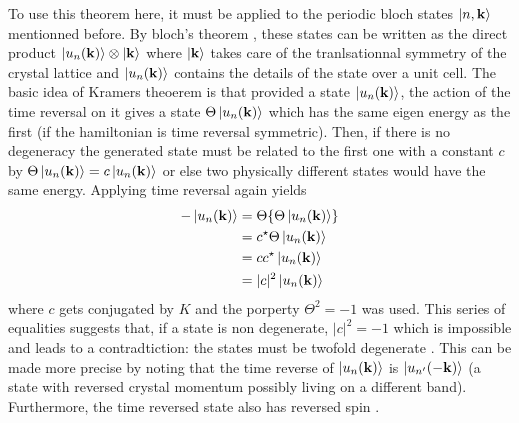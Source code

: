 To use this theorem here, it must be applied to the periodic bloch states $\ket{n, \mathbf{k}}$ mentionned before. By bloch's theorem \cite{girvin_modern_2019}, these states can be written as the direct product $\ket{u_n(\mathbf{k})}\otimes \ket{\mathbf{k}}$ where $\ket{\mathbf{k}}$ takes care of the tranlsationnal symmetry of the crystal lattice and $\ket{u_n(\mathbf{k})}$ contains the details of the state over a unit cell. The basic idea of Kramers theoerem is that provided a state $\ket{u_n(\mathbf{k})}$, the action of the time reversal on it gives a state $\Theta\ket{u_n(\mathbf{k})}$ which has the same eigen energy as the first (if the hamiltonian is time reversal symmetric). Then, if there is no degeneracy the generated state must be related to the first one with a constant $c$ by $\Theta \ket{u_n(\mathbf{k})} = c \ket{u_n(\mathbf{k})}$ or else two physically different states would have the same energy\cite{kane_topological_2013}. Applying time reversal again yields
\begin{align*} 
    -\ket{u_n(\mathbf{k})} &= \Theta \{\Theta\ket{u_n(\mathbf{k})}\}\\ &= c^\star \Theta \ket{u_n(\mathbf{k})}\\ &= c c^\star \ket{u_n(\mathbf{k})}\\ &= |c|^2\ket{u_n(\mathbf{k})}
\end{align*}
where $c$ gets conjugated by $K$ and the porperty $\Theta^2 =-1$ was used. This series of equalities suggests that, if a state is non degenerate, $|c|^2 = -1$ which is impossible and leads to a contradtiction: the states must be twofold degenerate \cite{kane_topological_2013}. This can be made more precise by noting that the time reverse of $\ket{u_n(\mathbf{k})}$ is $\ket{u_{n'}(\mathbf{-k})}$ \cite{bernevig_topological_2013} (a state with reversed crystal momentum possibly living on a different band). Furthermore, the time reversed state also has reversed spin \cite{kruthoff_topology_2019}.\\

